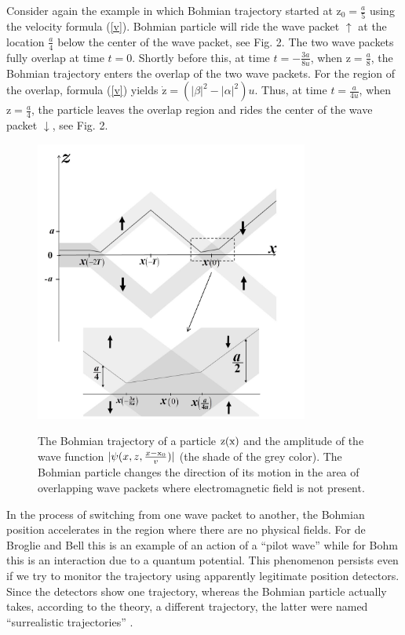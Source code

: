 \documentclass[12pt,preprint,tightenlines]{elsarticle}
\begin{document}
 Consider again the example  in which Bohmian trajectory started
at $\mathrm{z}_{0}=\frac{a}{5}$ using the velocity formula (\ref{v}). Bohmian
particle will ride the wave packet $\uparrow$ at the location $\frac{a}{4}$
below the center of the wave packet, see Fig. 2. The two wave packets fully overlap
at time $t=0$. Shortly before this, at time $t=-\frac{3a}{8u}$,
when $\mathrm{z}=\frac{a}{8}$, the Bohmian trajectory enters the overlap
of the two wave packets. For the region of the overlap, formula (\ref{v})
yields $\dot{\mathrm{z}}=(|\beta|^{2}-|\alpha|^{2})u$. Thus, at time
$t=\frac{a}{4u}$, when $\mathrm{z}=\frac{a}{4}$, the particle leaves the
overlap region and rides the center of the wave packet $\downarrow$, see Fig. 2.
\vspace {-12pt}
\begin{figure}[H]
  \includegraphics[width=9cm]{2.pdf}\\
  \vspace {-18pt}
       \caption{ The Bohmian trajectory of a particle $\rm z(x)$ and the amplitude of the wave function $|\psi(x,z,\frac{x-{\rm x}_0}{v})|$ (the shade of the grey color). The Bohmian particle changes the direction of its motion in the area of overlapping wave packets where electromagnetic field is not present.}
\end{figure}



In the process of switching from one wave packet to another, the Bohmian
position accelerates in the region where there are no physical fields.
For de Broglie and Bell this is an example of an action of
a ``pilot wave'' while for Bohm this is an interaction due to
a quantum potential. This phenomenon persists even if we
try to monitor the trajectory using apparently legitimate position
detectors. Since the detectors show one trajectory, whereas
the Bohmian particle actually takes, according to the theory, a different
trajectory, the latter were named ``surrealistic trajectories''
\cite{englert1992surrealistic}.
\end{document}
